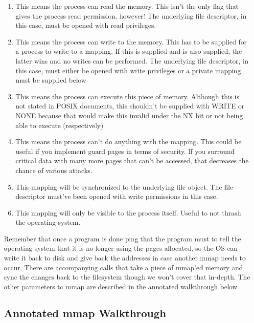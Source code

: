 	\begin{enumerate}
	\item {} This means the process can read the memory. This isn't the only flag that gives the process read permission, however! The underlying file descriptor, in this case, must be opened with read privileges.
	\item {} This means the process can write to the memory. This has to be supplied for a process to write to a mapping. If this is supplied and  is also supplied, the latter wins and no writes can be performed. The underlying file descriptor, in this case, must either be opened with write privileges or a private mapping must be supplied below
	\item {} This means the process can execute this piece of memory. Although this is not stated in POSIX documents, this shouldn't be supplied with WRITE or NONE because that would make this invalid under the NX bit or not being able to execute (respectively)
	\item {} This means the process can't do anything with the mapping. This could be useful if you implement guard pages in terms of security. If you surround critical data with many more pages that can't be accessed, that decreases the chance of various attacks.
	\item {} This mapping will be synchronized to the underlying file object. The file descriptor must've been opened with write permissions in this case.
	\item {} This mapping will only be visible to the process itself. Useful to not thrash the operating system.
	\end{enumerate}
	 
	Remember that once a program is done ping that the program must  to tell the operating system that it is no longer using the pages allocated, so the OS can write it back to disk and give back the addresses in case another mmap needs to occur.
	There are accompanying calls  that take a piece of mmap'ed memory and sync the changes back to the filesystem though we won't cover that in-depth.
	The other parameters to mmap are described in the annotated walkthrough below.
	 
	\subsection{Annotated mmap Walkthrough}
	 
